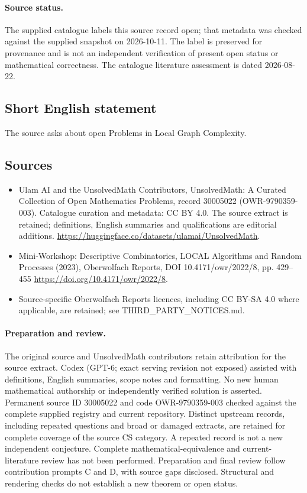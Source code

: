 \documentclass[11pt]{article}
\begin{document}
\paragraph{Source status.}
The supplied catalogue labels this source record open; that metadata was checked against the supplied snapshot on 2026-10-11. The label is preserved for provenance and is not an independent verification of present open status or mathematical correctness. The catalogue literature assessment is dated 2026-08-22.
\subsection{Short English statement}
The source asks about open Problems in Local Graph Complexity.
\subsection{Sources}
\begin{itemize}
\item[\hypertarget{source:30005022:1}{S1}] Ulam AI and the UnsolvedMath Contributors, UnsolvedMath: A Curated Collection of Open Mathematics Problems, record 30005022 (OWR-9790359-003). Catalogue curation and metadata: CC BY 4.0. The source extract is retained; definitions, English summaries and qualifications are editorial additions.
\url{https://huggingface.co/datasets/ulamai/UnsolvedMath}.
\item[\hypertarget{source:30005022:2}{S2}] Mini-Workshop: Descriptive Combinatorics, LOCAL Algorithms and Random Processes (2023), Oberwolfach Reports, DOI 10.4171/owr/2022/8, pp. 429--455
\url{https://doi.org/10.4171/owr/2022/8}.
\item Source-specific Oberwolfach Reports licences, including CC BY-SA 4.0 where applicable, are retained; see THIRD\_PARTY\_NOTICES.md.
\end{itemize}
\paragraph{Preparation and review.}
The original source and UnsolvedMath contributors retain attribution for the source extract. Codex (GPT-6; exact serving revision not exposed) assisted with definitions, English summaries, scope notes and formatting. No new human mathematical authorship or independently verified solution is asserted. Permanent source ID 30005022 and code OWR-9790359-003 checked against the complete supplied registry and current repository. Distinct upstream records, including repeated questions and broad or damaged extracts, are retained for complete coverage of the source CS category. A repeated record is not a new independent conjecture. Complete mathematical-equivalence and current-literature review has not been performed. Preparation and final review follow contribution prompts C and D, with source gaps disclosed. Structural and rendering checks do not establish a new theorem or open status.
\label{end:30005022}
\end{document}
